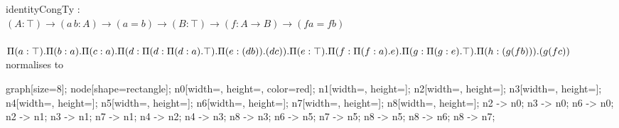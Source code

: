 
identityCongTy : \\
\begin{math}
(A : \top) \rightarrow (a \, b : A) \rightarrow (a = b) \rightarrow (B : \top) \rightarrow (f : A \rightarrow B) \rightarrow (f a = f b)
\end{math} \\ \\
\begin{math}
\Pi{(a : \top)} . \Pi{(b : a)} . \Pi{(c : a)} . \\ \Pi{(d : \Pi{(d : \Pi{(d : a)} . \top)} . \Pi{(e : (d b))} . (d c))} . \\ \Pi{(e : \top)} . \Pi{(f : \Pi{(f : a)} . e)} . \Pi{(g : \Pi{(g : e)} . \top)} . \Pi{(h : (g (f b)))} . \\ (g (f c))
\end{math} \\
 normalises to \\

\begin{psfrags}
\expandafter{} {
  graph[size=8];
  node[shape=rectangle];
  n0[width=, height=, color=red];
  n1[width=, height=];
  n2[width=, height=];
  n3[width=, height=];
  n4[width=, height=];
  n5[width=, height=];
  n6[width=, height=];
  n7[width=, height=];
  n8[width=, height=];
  n2 -> n0;
  n3 -> n0;
  n6 -> n0;
  n2 -> n1;
  n3 -> n1;
  n7 -> n1;
  n4 -> n2;
  n4 -> n3;
  n8 -> n3;
  n6 -> n5;
  n7 -> n5;
  n8 -> n5;
  n8 -> n6;
  n8 -> n7;
}
\end{psfrags}